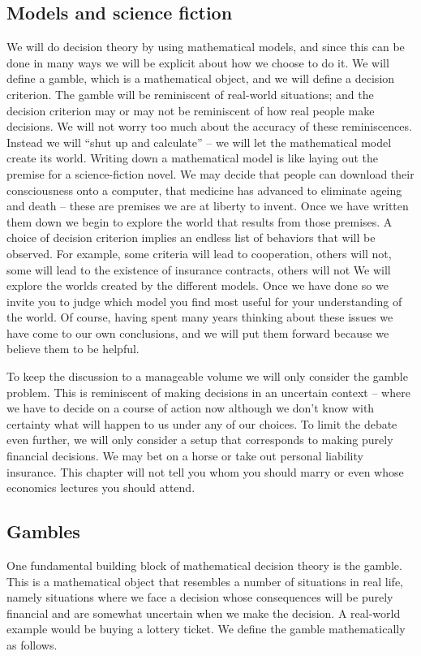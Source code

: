 \subsection{Models and science fiction}
We will do decision theory 
by using mathematical models, and since this can be done in many ways we will be
explicit about how we choose to do it. We will define a gamble, which 
is a mathematical object, and we will define a decision criterion. The gamble will be
reminiscent of real-world situations; and the decision criterion may or may not be reminiscent
of how real people make decisions. We will not worry too much about the accuracy 
of these reminiscences. Instead we will ``shut up and calculate'' -- we will let the mathematical
model create its world. Writing down a mathematical model is like laying out the premise for
a science-fiction novel. We may decide that people can download their consciousness onto a computer, 
that medicine has advanced to eliminate ageing and death -- these are premises we are at liberty to invent.
Once we have written them down we begin to explore the world that results from those premises.
A choice of decision criterion implies an endless list of behaviors that will
be observed. For example, some criteria will lead to cooperation, others will not, some will lead
to the existence of insurance contracts, others will not \etc We will explore the worlds created by the different
models. Once we have done so we invite you to judge which model you find most useful
for your understanding of the world. Of course, having spent many years thinking about these
issues we have come to our own conclusions, and we will put them forward because we believe them to be helpful.

To keep the discussion to a manageable volume we will only consider the gamble problem. 
This is reminiscent of making decisions in an uncertain context -- where we have to decide on
a course of action now although we don't know with certainty what will happen to us under any
of our choices. To limit the debate even further, we will only consider a setup that corresponds to
making purely financial decisions. We may bet on a horse or take out personal liability insurance.
This chapter will not tell you whom you should marry or even whose economics lectures you should attend.

\subsection{Gambles}
One fundamental building block of mathematical decision theory is the gamble.
This is a mathematical object that resembles a number of situations in real life, 
namely situations where we face a decision whose consequences will be purely
financial and are somewhat uncertain when we make the decision. A real-world example would be buying a lottery ticket. We define the gamble mathematically as follows.

